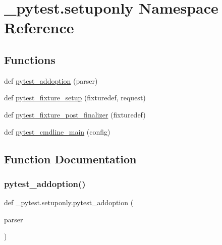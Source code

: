 \hypertarget{namespace__pytest_1_1setuponly}{}\section{\+\_\+pytest.\+setuponly Namespace Reference}
\label{namespace__pytest_1_1setuponly}
\subsection*{Functions}
\begin{DoxyCompactItemize}
\item 
def \hyperlink{namespace__pytest_1_1setuponly_aedd74191da88581b6cf7fea5f9868795}{pytest\+\_\+addoption} (parser)
\item 
def \hyperlink{namespace__pytest_1_1setuponly_a9608a72361ee47f72b690457c0e1c8fe}{pytest\+\_\+fixture\+\_\+setup} (fixturedef, request)
\item 
def \hyperlink{namespace__pytest_1_1setuponly_a05f6e5aa0312f88338edb8e6a4bb1f20}{pytest\+\_\+fixture\+\_\+post\+\_\+finalizer} (fixturedef)
\item 
def \hyperlink{namespace__pytest_1_1setuponly_a83e8cf222a356af6685e74e23d3539f0}{pytest\+\_\+cmdline\+\_\+main} (config)
\end{DoxyCompactItemize}


\subsection{Function Documentation}
\mbox{\label{namespace__pytest_1_1setuponly_aedd74191da88581b6cf7fea5f9868795}} 
\subsubsection{\texorpdfstring{pytest\+\_\+addoption()}{pytest\_addoption()}}
{\footnotesize\ttfamily def \+\_\+pytest.\+setuponly.\+pytest\+\_\+addoption (\begin{DoxyParamCaption}\item[{}]{parser }\end{DoxyParamCaption})}

\mbox{\label{namespace__pytest_1_1setuponly_a83e8cf222a356af6685e74e23d3539f0}} 
